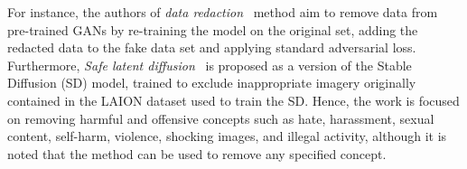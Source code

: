 \documentclass[conference]{IEEEtran}
\begin{document}
For instance, the authors of \textit{data redaction}~\cite{kong_data_2023} method aim to remove data from pre-trained GANs by re-training the model on the original set, adding the redacted data to the fake data set and applying standard adversarial loss. 
Furthermore, \textit{Safe latent diffusion}~\cite{schramowski_safe_2023} is proposed as a version of the Stable Diffusion (SD) model, trained to exclude inappropriate imagery originally contained in the LAION dataset used to train the SD. Hence, the work is focused on removing harmful and offensive concepts such as hate, harassment, sexual content, self-harm, violence, shocking images, and illegal activity, although it is noted that the method can be used to remove any specified concept.


\end{document}
